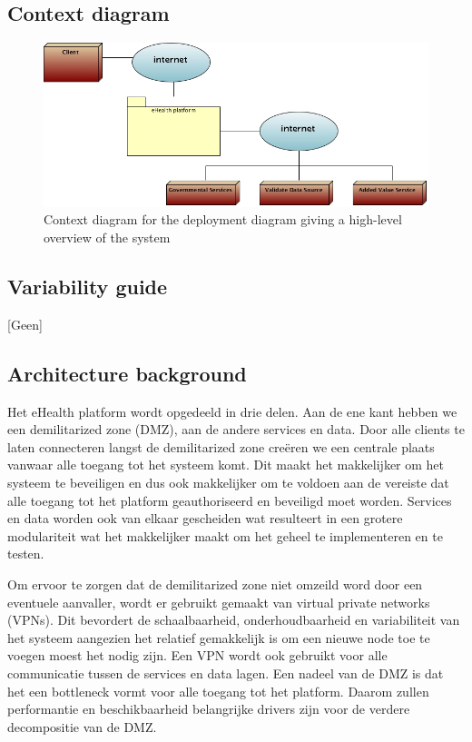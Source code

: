\documentclass[a4paper,10pt]{article}
\begin{document}
\subsection{Context diagram}
\begin{center}
    \begin{figure}[!h]
      \includegraphics[scale=0.60]{../images/deployment_DMZ_context.jpg}
	\caption{Context diagram for the deployment diagram giving a high-level overview of the system}
    \end{figure}
 \end{center}

\subsection{Variability guide}
[Geen]

\subsection{Architecture background}

Het eHealth platform wordt opgedeeld in drie delen. Aan de ene kant hebben we een demilitarized zone (DMZ), aan de andere services en data. Door alle clients te laten connecteren langst de demilitarized zone creëren we een centrale plaats vanwaar alle toegang tot het systeem komt. Dit maakt het makkelijker om het systeem te beveiligen en dus ook makkelijker om te voldoen aan de vereiste dat alle toegang tot het platform geauthoriseerd en beveiligd moet worden. Services en data worden ook van elkaar gescheiden wat resulteert in een grotere modulariteit wat het makkelijker maakt om het geheel te implementeren en te testen.

Om ervoor te zorgen dat de demilitarized zone niet omzeild word door een eventuele aanvaller, wordt er gebruikt gemaakt van virtual private networks (VPNs). Dit bevordert de schaalbaarheid, onderhoudbaarheid en variabiliteit van het systeem aangezien het relatief gemakkelijk is om een nieuwe node toe te voegen moest het nodig zijn. Een VPN wordt ook gebruikt voor alle communicatie tussen de services en data lagen. Een nadeel van de DMZ is dat het een bottleneck vormt voor alle toegang tot het platform. Daarom zullen performantie en beschikbaarheid belangrijke drivers zijn voor de verdere decompositie van de DMZ.
\end{document}
